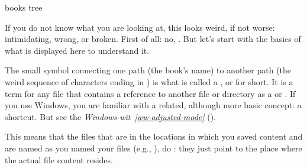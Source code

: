 \begin{sphinxVerbatim}[commandchars=\\\{\}]
books
tree

\end{sphinxVerbatim}

\sphinxAtStartPar
If you do not know what you are looking at,
this looks weird, if not worse: intimidating, wrong, or broken.
First of all: no, . But let’s start with the basics of what is displayed
here to understand it.

\sphinxAtStartPar
The small \sphinxcode{\sphinxupquote{\sphinxhyphen{}\textgreater{}}} symbol connecting one path (the book’s name) to another path (the weird
sequence of characters ending in ) is what is called a
, {\hyperref[\detokenize{glossary:term-symlink}]{}} or  for short.
It is a term for any file that contains a reference to another file or directory as
a {\hyperref[\detokenize{glossary:term-relative-path}]{}} or {\hyperref[\detokenize{glossary:term-absolute-path}]{}}.
If you use Windows, you are familiar with a related, although more basic concept: a shortcut. But see the \textit{Windows-wit}~{\windowswiticoninline}\textit{\ref{ww-adjusted-mode}} {\hyperref[\detokenize{basics/101-115-symlinks:ww-adjusted-mode}]{}} ().

\sphinxAtStartPar
This means that the files that are in the locations in which you saved content
and are named as you named your files (e.g., ),
do :
they just point to the place where the actual file content resides.

